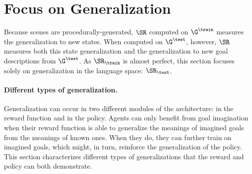 
\clearpage


\section{Focus on Generalization}
\label{sec:supp_focus_gene}
Because scenes are procedurally-generated, $\SR$ computed on $\G^\train$ measures the generalization to new states. When computed on $\G^\test$, however, $\SR$ measures both this state generalization and the generalization to new goal descriptions from $\G^\test$. As $\SR_\train$ is almost perfect, this section focuses solely on generalization in the language space: $\SR_\test$.


\paragraph{Different types of generalization.}
Generalization can occur in two different modules of the \imagine architecture: in the reward function and in the policy. Agents can only benefit from goal imagination when their reward function is able to generalize the meanings of imagined goals from the meanings of known ones. When they do, they can further train on imagined goals, which might, in turn, reinforce the generalization of the policy. This section characterizes different types of generalizations that the reward and policy can both demonstrate.

